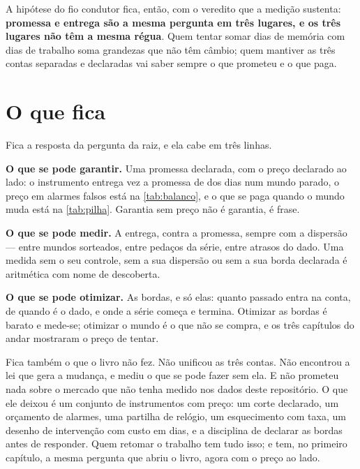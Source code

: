 A hipótese do fio condutor fica, então, com o veredito que a medição sustenta: \textbf{promessa e entrega
são a mesma pergunta em três lugares, e os três lugares não têm a mesma régua}. Quem tentar somar
dias de memória com dias de trabalho soma grandezas que não têm câmbio; quem mantiver as três
contas separadas e declaradas vai saber sempre o que prometeu e o que paga.

\section{O que fica}

Fica a resposta da pergunta da raiz, e ela cabe em três linhas.

\textbf{O que se pode garantir.} Uma promessa declarada, com o preço declarado ao lado: o instrumento
entrega \numFechoParadoLongaSemAtraso{} vez a promessa de \numFechoPromessa{} dos dias num mundo parado, o preço em alarmes falsos está na
\cref{tab:balanco}, e o que se paga quando o mundo muda está na \cref{tab:pilha}. Garantia sem preço
não é garantia, é frase.

\textbf{O que se pode medir.} A entrega, contra a promessa, sempre com a dispersão --- entre mundos
sorteados, entre pedaços da série, entre atrasos do dado. Uma medida sem o seu controle, sem a sua
dispersão ou sem a sua borda declarada é aritmética com nome de descoberta.

\textbf{O que se pode otimizar.} As bordas, e só elas: quanto passado entra na conta, de quando é o dado,
e onde a série começa e termina. Otimizar as bordas é barato e mede-se; otimizar o mundo é o que não
se compra, e os três capítulos do andar mostraram o preço de tentar.

Fica também o que o livro não fez. Não unificou as três contas. Não encontrou a lei que gera a
mudança, e mediu o que se pode fazer sem ela. E não prometeu nada sobre o mercado que não tenha
medido nos dados deste repositório. O que ele deixou é um conjunto de instrumentos com
preço: um corte declarado, um orçamento de alarmes, uma partilha de relógio, um esquecimento com
taxa, um desenho de intervenção com custo em dias, e a disciplina de declarar as bordas antes de
responder. Quem retomar o trabalho tem tudo isso; e tem, no primeiro capítulo, a mesma pergunta que
abriu o livro, agora com o preço ao lado.
